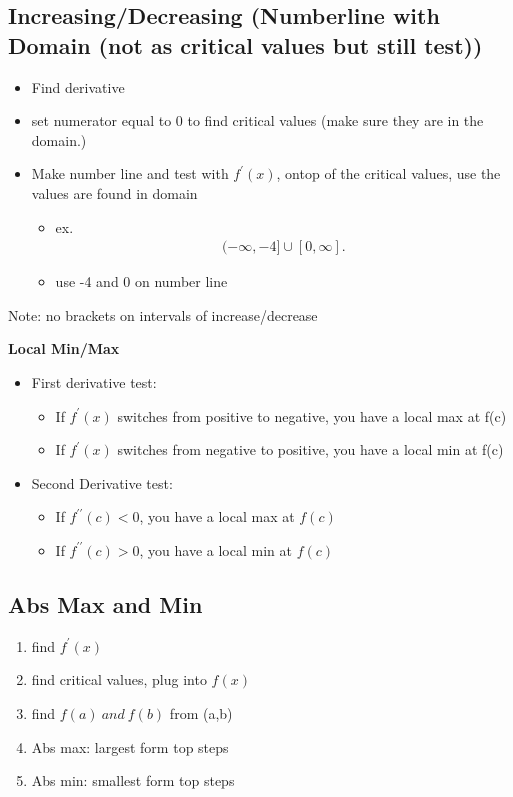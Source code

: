 \documentclass{report}
\begin{document}
    \subsection{Increasing/Decreasing (Numberline with Domain (not as critical values but still test))}
    \begin{itemize}
      \item Find derivative
      \item set numerator equal to 0 to find critical values (make sure they are in the domain.)
      \item Make number line and test with $f^{\prime}(x)$, ontop of the critical values, use the values are found in domain
        \begin{itemize}
          \item ex.
            \begin{align*}
              (-\infty, -4]\cup [0,\infty]
            .\end{align*}
          \item use -4 and 0 on number line
        \end{itemize}
    \end{itemize}
    \bigbreak \noindent 
    Note: no brackets on intervals of increase/decrease
    \bigbreak \noindent \bigbreak \noindent 
    \begin{large}
      \textbf{Local Min/Max}
    \end{large}
    \begin{itemize}
      \item First derivative test: 
        \begin{itemize}
          \item If $f^{\prime}(x)$ switches from positive to negative, you have a local max at f(c)
          \item If $f^{\prime}(x)$ switches from negative to positive, you have a local min at f(c)
        \end{itemize}
      \item Second Derivative test: 
        \begin{itemize}
          \item If $f^{\prime\prime}(c) < 0$, you have a local max at $f(c)$
          \item If $f^{\prime\prime}(c) > 0$, you have a local min at $f(c)$
        \end{itemize}
    \end{itemize}


    \bigbreak \noindent \bigbreak \noindent 
    \subsection{Abs Max and Min}
      \begin{enumerate}
        \item find $f^{\prime}(x)$
        \item find critical values, plug into $f(x)$
        \item find $f(a)\ and\ f(b)$ from (a,b)
        \item Abs max: largest form top steps
        \item Abs min: smallest form top steps
      \end{enumerate}
\end{document}

